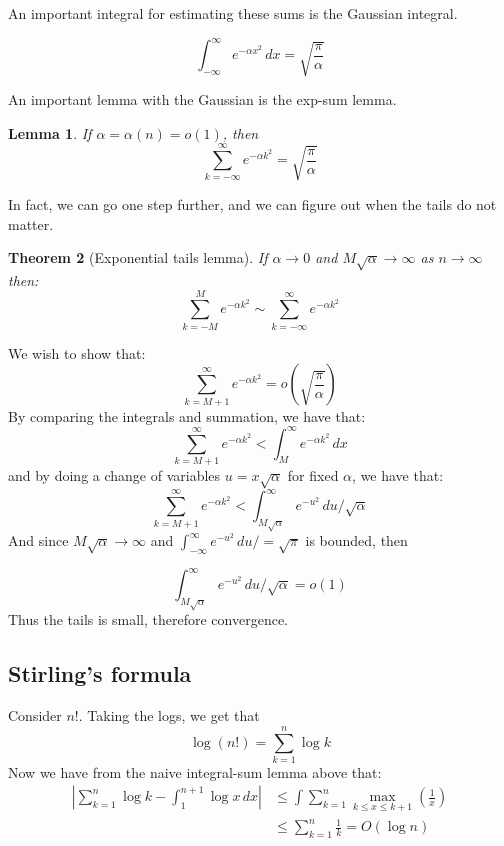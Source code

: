 \documentclass[]{article}
\newtheorem{theorem}{Theorem}
\newtheorem{lemma}[theorem]{Lemma}
\theoremstyle{definition}
\numberwithin{theorem}{section}
\numberwithin{equation}{section}
\begin{document}
An important integral for estimating these sums is the Gaussian integral.

\begin{equation}
	\int_{-\infty}^\infty e^{- \alpha x^2} \, dx = \sqrt{\frac{\pi}{\alpha}}
\end{equation}

An important lemma with the Gaussian is the exp-sum lemma.
\begin{lemma}
	If $\alpha = \alpha(n) = o(1)$, then
\begin{equation}
	\sum_{k = -\infty}^\infty e^{- \alpha k^2} = \sqrt{\frac{\pi}{\alpha}}
\end{equation}
\end{lemma}

In fact, we can go one step further, and we can figure out when the tails do not matter.

\begin{theorem}[Exponential tails lemma]
	If $\alpha \rightarrow 0$ and $M \sqrt{\alpha} \rightarrow \infty$ as $n \rightarrow \infty$ then:
	\begin{equation}
		\sum_{k = - M}^{M} e^{- \alpha k^2} \sim \sum_{k = - \infty}^{\infty} e^{- \alpha k^2}
	\end{equation}
\end{theorem}
We wish to show that:
\begin{equation}
	\sum_{k = M + 1}^{\infty} e^{- \alpha k^2} = o(\sqrt{\frac{\pi}{\alpha}})
\end{equation}
By comparing the integrals and summation, we have that:
\begin{equation}
	\sum_{k = M + 1}^{\infty} e^{- \alpha k^2} < \int_{ M }^{\infty} e^{- \alpha k^2} \, dx
\end{equation}
and by doing a change of variables $u = x \sqrt{\alpha}$ for fixed $\alpha$, we have that:
\begin{equation}
	\sum_{k = M + 1}^{\infty} e^{- \alpha k^2} < \int_{ M \sqrt{\alpha}}^{\infty} e^{- u^2} \, du/\sqrt{\alpha}
\end{equation}
And since $M \sqrt{\alpha} \rightarrow \infty$ and $\int_{ -\infty}^{\infty} e^{- u^2} \, du/ = \sqrt{\pi}$ is bounded, then

\begin{equation}
	 \int_{ M \sqrt{\alpha}}^{\infty} e^{- u^2} \, du/\sqrt{\alpha} = o(1)
\end{equation}
Thus the tails is small, therefore convergence. 

\subsection{Stirling's formula}
Consider $n!$. Taking the logs, we get that 
\begin{equation}
	\log(n !) = \sum_{k = 1}^{n} \log k
\end{equation}
Now we have from the naive integral-sum lemma above that:
\begin{align*}
	\left|\sum_{k = 1}^{n} \log k - \int_1^{n + 1} \log x \, dx\right| &\leq \int \sum_{k = 1}^n \max_{k \leq x \leq k + 1} \left(\frac{1}{x}\right)\\
	&\leq \sum_{k = 1}^n \frac{1}{k} = O(\log n)
\end{align*}
\end{document}
